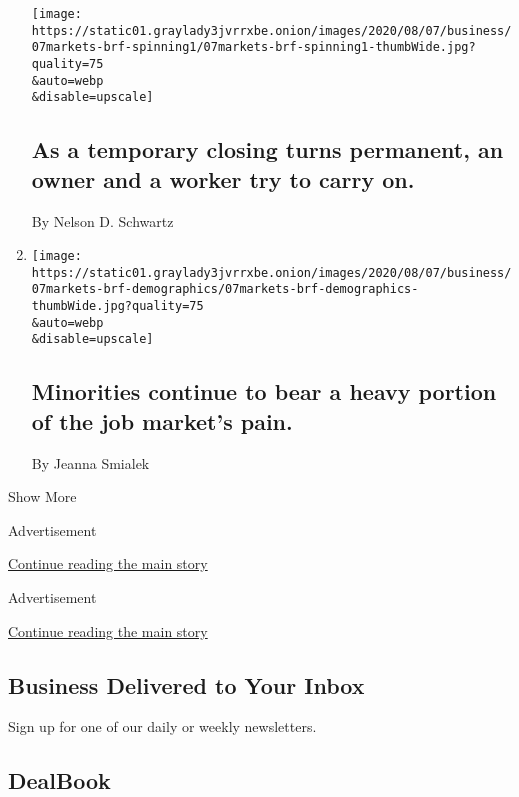 \begin{enumerate}
  \texttt{[image: https://static01.graylady3jvrrxbe.onion/images/2020/08/07/business/07markets-brf-spinning1/07markets-brf-spinning1-thumbWide.jpg?quality=75\\\&auto=webp\\\&disable=upscale]}

  \hypertarget{as-a-temporary-closing-turns-permanent-an-owner-and-a-worker-try-to-carry-on}{%
  \subsection{As a temporary closing turns permanent, an owner and a
  worker try to carry
  on.}\label{as-a-temporary-closing-turns-permanent-an-owner-and-a-worker-try-to-carry-on}}

  By Nelson D. Schwartz
\item
  \href{/2020/08/07/business/minorities-continue-to-bear-a-heavy-portion-of-the-job-markets-pain.html}{}

  \texttt{[image: https://static01.graylady3jvrrxbe.onion/images/2020/08/07/business/07markets-brf-demographics/07markets-brf-demographics-thumbWide.jpg?quality=75\\\&auto=webp\\\&disable=upscale]}

  \hypertarget{minorities-continue-to-bear-a-heavy-portion-of-the-job-markets-pain}{%
  \subsection{Minorities continue to bear a heavy portion of the job
  market's
  pain.}\label{minorities-continue-to-bear-a-heavy-portion-of-the-job-markets-pain}}

  By Jeanna Smialek
\end{enumerate}

Show More

Advertisement

\protect\hyperlink{after-mid2}{Continue reading the main story}

Advertisement

\protect\hyperlink{after-mktg}{Continue reading the main story}

\hypertarget{business-delivered-to-your-inbox}{%
\subsection{Business Delivered to Your
Inbox}\label{business-delivered-to-your-inbox}}

Sign up for one of our daily or weekly newsletters.

\hypertarget{dealbook}{%
\subsection{DealBook}\label{dealbook}}

